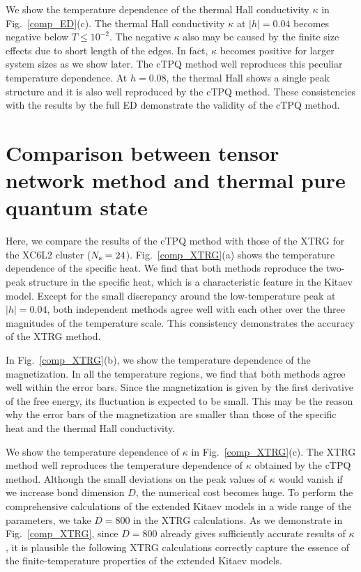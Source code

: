 \documentclass[reprint,amsmath,amssymb,aps,prx]{revtex4-2}
\begin{document}
We show the temperature dependence of the thermal 
Hall conductivity $\kappa$ in Fig.~\ref{comp_ED}(c).
The thermal Hall conductivity $\kappa$ at $|h|=0.04$
becomes negative below $T\leq 10^{-2}$. The negative $\kappa$ also may be 
caused by the finite size effects due to short length of the edges.
In fact, $\kappa$ becomes positive for larger system sizes as we show later.
The cTPQ method well reproduces this peculiar temperature 
dependence. At $h=0.08$, the thermal Hall shows 
a single peak structure and it is also well reproduced by the 
cTPQ method.
These consistencies with the results by the full ED demonstrate
the validity of the cTPQ method.

\section{Comparison between tensor network method and thermal pure quantum state}
Here, we compare the results of the cTPQ method with those of the XTRG
for the XC6L2 cluster ($N_{\rm s}=24$). 
Fig.~\ref{comp_XTRG}(a) shows the temperature dependence of the specific heat. 
We find that both methods reproduce 
the two-peak structure in the specific heat, which is a 
characteristic feature in the Kitaev model. 
Except for the small discrepancy around the low-temperature peak 
at $|h|=0.04$, both independent methods agree well with each other
over the three magnitudes of the temperature scale.
This consistency demonstrates the accuracy of the XTRG method.

In Fig.~\ref{comp_XTRG}(b),
we show the temperature dependence of the magnetization.
In all the temperature regions, 
we find that both methods agree well within the error bars.
Since the magnetization is given by the first derivative of the
free energy, its fluctuation is expected to be small.
This may be the reason why the error bars of the magnetization
are smaller than those of the specific heat 
and the thermal Hall conductivity.

We show the temperature dependence of $\kappa$
in Fig.~\ref{comp_XTRG}(c).
The XTRG method well reproduces the 
temperature dependence of $\kappa$ obtained by the cTPQ method.
Although the small deviations on the peak values of $\kappa$ 
would vanish if we increase bond dimension $D$,
the numerical cost becomes huge. 
To perform the comprehensive calculations of the extended Kitaev models 
in a wide range of the parameters,
we take $D=800$ in the XTRG calculations.
As we demonstrate in Fig.~\ref{comp_XTRG}, 
since $D=800$ already gives sufficiently accurate
results of $\kappa$, it is plausible 
the following XTRG calculations correctly capture the essence of the
finite-temperature properties of the extended Kitaev models. 
\end{document}

